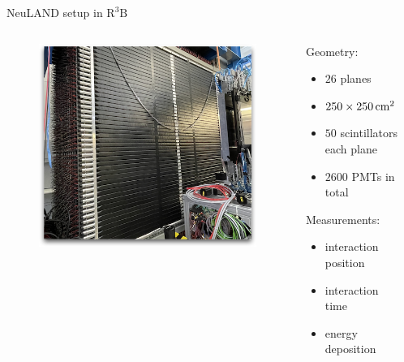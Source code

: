 \documentclass{ikpKoeln}
\begin{document}
{\begin{frame}{NeuLAND setup in $\text{R}^3\text{B}$}
	\begin{columns}[c]
		\begin{column}{0.4\textwidth}
			\pause
			\begin{figure}
				\includegraphics[width = \textwidth]{neuland/neulandReal}
			\end{figure}
		\end{column}
		\hspace*{0.5cm}
		\begin{column}{0.3\textwidth}
			\begin{exampleblock}{}
				Geometry:\\
				\begin{itemize}
					\item $26$ planes
					\item $\qtyproduct[product-units=power]{250 x 250}{\centi\meter}$
					\item $50$ scintillators each plane
					\item $2600$ PMTs in total
				\end{itemize}
				\pause
				Measurements:\\
				\begin{itemize}
					\item interaction position
					\item interaction time
					\item energy deposition
				\end{itemize}
			\end{exampleblock}
		\end{column}
		\begin{column}{0.3\textwidth}
		\end{column}
	\end{columns}
\end{frame}
}
\end{document}
